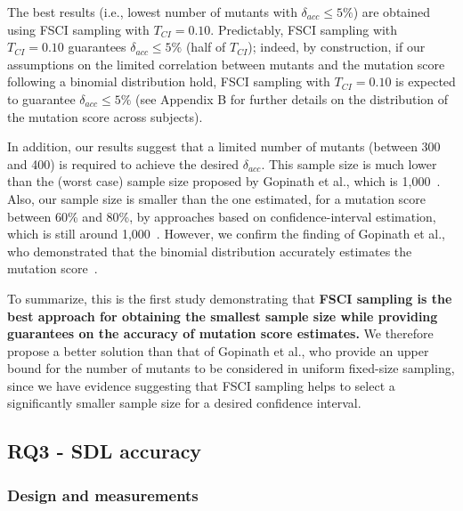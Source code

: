 The best results (i.e., lowest number of mutants with $\delta_{acc} \le 5\%$) are obtained using  FSCI sampling with $T_\mathit{CI}=0.10$. Predictably, FSCI sampling with $T_\mathit{CI}=0.10$ guarantees $\delta_{acc} \le 5\%$ (half of $T_\mathit{CI}$); indeed, by construction, if our assumptions
on the limited correlation between mutants and the mutation score following a  binomial distribution hold,
FSCI sampling with $T_\mathit{CI}=0.10$ is expected to guarantee $\delta_{acc} \le 5\%$ (see Appendix
B
for further details on the distribution of the mutation score across subjects).

In addition, our results suggest that a limited number of mutants (between 300 and 400) is required to achieve the desired $\delta_{acc}$. This sample size is much lower than the (worst case) sample size proposed by Gopinath et al., which is 1,000~\cite{gopinath2015hard}. Also, our sample size is smaller
than the one estimated, for a mutation score between 60\% and 80\%, by
approaches
based on confidence-interval estimation, which is still around 1,000~\cite{Goncalves2012}.
However, we confirm the finding of Gopinath et al., who demonstrated that the binomial distribution %
accurately estimates the mutation score~\cite{gopinath2015hard}.

To summarize, this is the first study demonstrating that \textbf{FSCI sampling is the
best approach for obtaining the smallest sample size
while providing guarantees on the accuracy of mutation score estimates.}
We therefore propose a better solution than that of Gopinath et al., who provide an upper bound for the number of mutants to be considered in uniform fixed-size sampling, since we have evidence suggesting that FSCI sampling helps to select a significantly smaller sample size for a desired confidence interval.





\subsection{RQ3 - SDL accuracy}



\subsubsection{Design and measurements}



